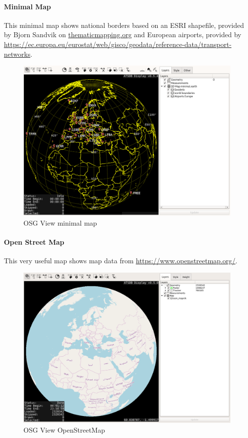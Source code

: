\newpage
\paragraph{Minimal Map}

This minimal map shows national borders based on an ESRI shapefile, provided by Bjorn Sandvik on \url{thematicmapping.org} and European airports, provided by \url{https://ec.europa.eu/eurostat/web/gisco/geodata/reference-data/transport-networks}.

\begin{figure}[H]
    \hspace*{-2.5cm}
    \includegraphics[width=19cm,frame]{figures/osgview_minimal.png}
  \caption{OSG View minimal map}
\end{figure}

\newpage
\paragraph{Open Street Map}

This very useful map shows map data from \url{https://www.openstreetmap.org/}.

\begin{figure}[H]
    \hspace*{-2.5cm}
    \includegraphics[width=19cm,frame]{figures/osgview_osm.png}
  \caption{OSG View OpenStreetMap}
\end{figure}

